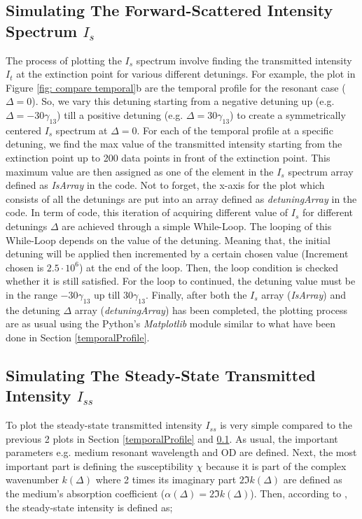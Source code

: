 \subsection{Simulating The Forward-Scattered Intensity Spectrum $I_{s}$}\label{forwardScattered}
The process of plotting the $I_{s}$ spectrum involve finding the transmitted intensity $I_{t}$ at the extinction point for various different detunings. For example, the plot in Figure \ref{fig: compare temporal}b are the temporal profile for the resonant case ($\Delta = 0$). So, we vary this detuning starting from a negative detuning up (e.g. $\Delta = -30\gamma_{13}$) till a positive detuning (e.g. $\Delta = 30\gamma_{13}$) to create a symmetrically centered $I_{s}$ spectrum at $\Delta = 0$. For each of the temporal profile at a specific detuning, we find the max value of the transmitted intensity starting from the extinction point up to 200 data points in front of the extinction point. This maximum value are then assigned as one of the element in the $I_{s}$ spectrum array defined as \textit{IsArray} in the code. Not to forget, the x-axis for the plot which consists of all the detunings are put into an array defined as \textit{detuningArray} in the code. In term of code, this iteration of acquiring different value of $I_{s}$ for different detunings $\Delta$ are achieved through a simple While-Loop. The looping of this While-Loop depends on the value of the detuning. Meaning that, the initial detuning will be applied then incremented by a certain chosen value (Increment chosen is $2.5 \cdot 10^{6}$) at the end of the loop. Then, the loop condition is checked whether it is still satisfied. For the loop to continued, the detuning value must be in the range $-30\gamma_{13}$ up till $30\gamma_{13}$. Finally, after both the $I_{s}$ array (\textit{IsArray}) and the detuning $\Delta$ array (\textit{detuningArray}) has been completed, the plotting process are as usual using the Python's \textit{Matplotlib} module similar to what have been done in Section \ref{temporalProfile}.

\subsection{Simulating The Steady-State Transmitted Intensity $I_{ss}$}\label{steady}
To plot the steady-state transmitted intensity $I_{ss}$ is very simple compared to the previous 2 plots in Section \ref{temporalProfile} and \ref{forwardScattered}. As usual, the important parameters e.g. medium resonant wavelength and OD are defined. Next, the most important part is defining the susceptibility $\chi$ because it is part of the complex wavenumber $k(\Delta)$ where 2 times its imaginary part $2\Im{k(\Delta)}$ are defined as the medium's absorption coefficient ($\alpha(\Delta) = 2\Im{k(\Delta)}$). Then, according to \cite{boyd2020nonlinear}, the steady-state intensity is defined as;

